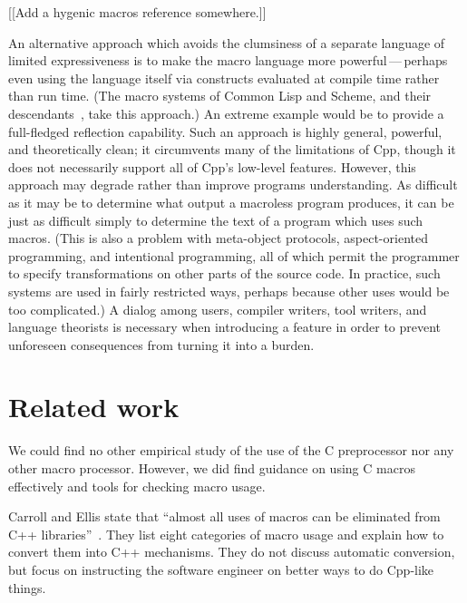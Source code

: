 \documentclass[11pt]{article}
\begin{document}
[[Add a hygenic macros reference somewhere.]]

An alternative approach which avoids the clumsiness of a separate language
of limited expressiveness is to make the macro language more
powerful\,---\,perhaps even using the language itself via constructs
evaluated at compile time rather than run time.  (The macro systems of
Common Lisp and Scheme, and their descendants~\cite{WeiseC93}, take this
approach.)  An extreme example would be to provide a full-fledged
reflection capability.  Such an approach is highly general, powerful, and
theoretically clean; it circumvents many of the limitations of Cpp,
though it does not necessarily support all of Cpp's low-level features.
However, this approach may degrade rather than improve programs
understanding.  As difficult as it may be to determine what output a
macroless program produces, it can be just as difficult simply to determine
the text of a program which uses such macros.  (This is also a problem with
meta-object protocols, aspect-oriented programming, and intentional
programming, all of which permit the programmer to specify transformations
on other parts of the source code.  In practice, such systems are used in
fairly restricted ways, perhaps because other uses would be too
complicated.)  A dialog among users, compiler writers, tool writers, and
language theorists is necessary when introducing a feature in order to
prevent unforeseen consequences from turning it into a burden.


% 


\section{Related work}
\label{sec:related}

We could find no other empirical study of the use of the C preprocessor nor
any other macro processor.  However, we did find guidance on using C macros
effectively and tools for checking macro usage.

Carroll and Ellis state that ``almost all uses of macros can be eliminated
from C++ libraries''~\cite[p.~146]{Carroll95}.  They list eight categories
of macro usage and explain how to convert them into C++ mechanisms.  They
do not discuss automatic conversion, but focus on instructing the software
engineer on better ways to do Cpp-like things.
\end{document}
